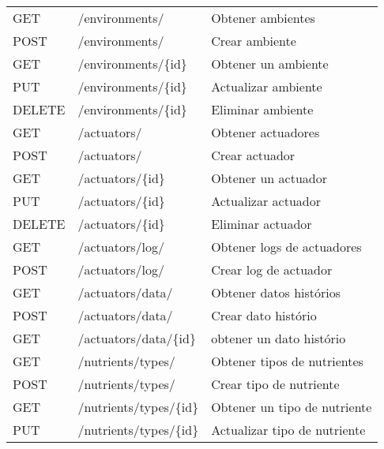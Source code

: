 \begin{table}[H]
\begin{tabular}{l l l}
        \midrule
        GET             & /environments/                   & Obtener ambientes            \\
        POST            & /environments/                   & Crear ambiente               \\
        GET             & /environments/\{id\}             & Obtener un ambiente          \\
        PUT             & /environments/\{id\}             & Actualizar ambiente          \\
        DELETE          & /environments/\{id\}             & Eliminar ambiente            \\
        \midrule
        GET             & /actuators/                      & Obtener actuadores           \\
        POST            & /actuators/                      & Crear actuador               \\
        GET             & /actuators/\{id\}                & Obtener un actuador          \\
        PUT             & /actuators/\{id\}                & Actualizar actuador          \\
        DELETE          & /actuators/\{id\}                & Eliminar actuador            \\
        \midrule
        GET             & /actuators/log/                  & Obtener logs de actuadores   \\
        POST            & /actuators/log/                  & Crear log de actuador        \\
        \midrule
        GET             & /actuators/data/                 & Obtener datos histórios      \\
        POST            & /actuators/data/                 & Crear dato histório          \\
        GET             & /actuators/data/\{id\}           & obtener un dato histório     \\
        \midrule
        GET             & /nutrients/types/                & Obtener tipos de nutrientes  \\
        POST            & /nutrients/types/                & Crear tipo de nutriente      \\
        GET             & /nutrients/types/\{id\}          & Obtener un tipo de nutriente \\
        PUT             & /nutrients/types/\{id\}          & Actualizar tipo de nutriente \\

\end{tabular}
\end{table}
